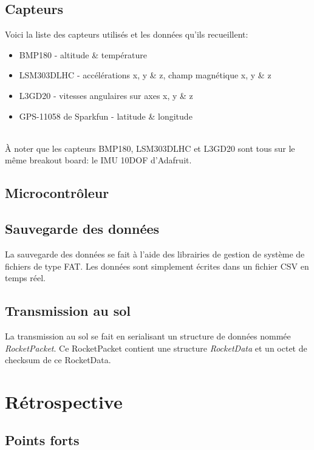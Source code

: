 \subsection{Capteurs}

Voici la liste des capteurs utilisés et les données qu'ils recueillent:
~\\

\begin{itemize}
	\item BMP180 - altitude \& température
	\item LSM303DLHC - accélérations x, y \& z, champ magnétique x, y \& z
	\item L3GD20 - vitesses angulaires sur axes x, y \& z
	\item GPS-11058 de Sparkfun - latitude \& longitude
\end{itemize}

~\\
À noter que les capteurs BMP180, LSM303DLHC et L3GD20 sont tous sur le même
breakout board: le IMU 10DOF d'Adafruit.

\subsection{Microcontrôleur}



\subsection{Sauvegarde des données}

La sauvegarde des données se fait à l'aide des librairies de gestion de système
de fichiers de type FAT. Les données sont simplement écrites dans un fichier
CSV en temps réel.

\subsection{Transmission au sol}

La transmission au sol se fait en serialisant un structure de données nommée
\textit{RocketPacket}. Ce RocketPacket contient une structure
\textit{RocketData} et un octet de checksum de ce RocketData.

\section{Rétrospective}

\subsection{Points forts}

